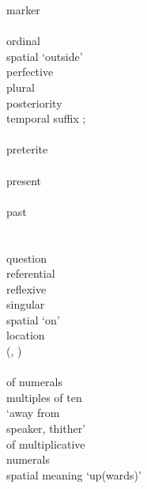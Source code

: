 \begin{multicols}{2}
\begin{tabbing}
				\>	 marker\\
				\>	\\
				\>	ordinal\\
				\>	spatial  `outside'\\
				\>	perfective\\
				\>	plural\\
				\>	posteriority \\
			{}		\>	    temporal suffix ;\\
			{}		\>	      \\
				\>	preterite\\
				\>	\\
				\>	present\\
				\>	\\
				\>	past\\
				\>	\\
				\>	\\
					\>	question\\
				\>	referential\\
				\>	reflexive\\
				\>	singular\\
				\>	spatial  `on'\\
				\>	location \\
			{}		\>	(, )\\
				\>	\\
				\>	 of numerals \\ \> multiples of ten\\
				\>	 `away from \\ \> speaker, thither'\\
				\>	 of multiplicative \\ \> numerals\\
				\>	spatial meaning `up(wards)'\\
		\end{tabbing}
	\end{multicols}

